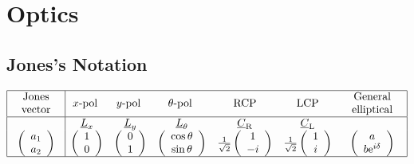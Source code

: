 \documentclass[12pt,a4paper]{article}
\begin{document}
\section{Optics}
\subsection{Jones's Notation}
$$
    \begin{array}{|c|cccccc|}
    \hline \begin{array}{c}
    \text { Jones } \\
    \text { vector }
    \end{array} & x \text {-pol } & y \text {-pol } & \theta \text {-pol } & \text { RCP } & \text { LCP } & \begin{array}{c}
    \text { General } \\
    \text { elliptical }
    \end{array} \\
    \hline & \underline{L}_x & \underline{L}_y & \underline{L}_\theta & \underline{C}_{\mathrm{R}} & \underline{C}_{\mathrm{L}} & \\
    \left(\begin{array}{c}
    a_1 \\
    a_2
    \end{array}\right) & \left(\begin{array}{l}
    1 \\
    0
    \end{array}\right) & \left(\begin{array}{l}
    0 \\
    1
    \end{array}\right) & \left(\begin{array}{c}
    \cos \theta \\
    \sin \theta
    \end{array}\right) & \frac{1}{\sqrt{2}}\left(\begin{array}{c}
    1 \\
    -i
    \end{array}\right) & \frac{1}{\sqrt{2}}\left(\begin{array}{c}
    1 \\
    i
    \end{array}\right) & \left(\begin{array}{c}
    a \\
    b \mathrm{e}^{i \delta}
    \end{array}\right) \\
    \hline
    \end{array}
$$
\end{document}

